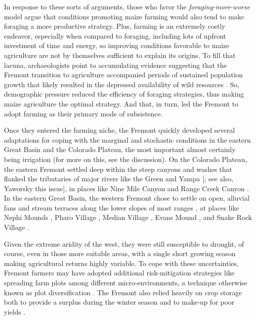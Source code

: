 \documentclass[
  number,
  preprint,
  3p]{elsarticle}
\begin{document}
In response to these sorts of arguments, those who favor the
\emph{foraging-more-worse} model \citep{hart2021, barlow2002} argue that
conditions promoting maize farming would also tend to make foraging a
more productive strategy. Plus, farming is an extremely costly endeavor,
especially when compared to foraging, including lots of upfront
investment of time and energy, so improving conditions favorable to
maize agriculture are not by themselves sufficient to explain its
origins. To fill that lacuna, archaeologists point to accumulating
evidence suggesting that the Fremont transition to agriculture
accompanied periods of sustained population growth
\citep{barlow2008, codding2021, spangler2013} that likely resulted in
the depressed availability of wild resources
\citep{barlow2002, janetski1997, simms1986}. So, demographic pressure
reduced the efficiency of foraging strategies, thus making maize
agriculture the optimal strategy. And that, in turn, led the Fremont to
adopt farming as their primary mode of subsistence.

Once they entered the farming niche, the Fremont quickly developed
several adaptations for coping with the marginal and stochastic
conditions in the eastern Great Basin and the Colorado Plateau, the most
important almost certainly being irrigation (for more on this, see the
discussion). On the Colorado Plateau, the eastern Fremont settled deep
within the steep canyons and washes that flanked the tributaries of
major rivers like the Green and Yampa {[}\citep{yaworsky2021}; see also,
Yaworsky this issue{]}, in places like Nine Mile Canyon
\citep{spangler1993} and Range Creek Canyon \citep{hart2021}. In the
eastern Great Basin, the western Fremont chose to settle on open,
alluvial fans and stream terraces along the lower slopes of most ranges
\citep{janetski2000, madsen1998, simms2008}, at places like Nephi Mounds
\citep{sharrock1967}, Pharo Village \citep{marwitt1968}, Median Village
\citep{marwitt1970}, Evans Mound \citep{berry1972, dodd1982}, and Snake
Rock Village \citep{aikens1967}.

Given the extreme aridity of the west, they were still susceptible to
drought, of course, even in those more suitable areas, with a single
short growing season making agricultural returns highly variable. To
cope with these uncertainties, Fremont farmers may have adopted
additional risk-mitigation strategies like spreading farm plots among
different micro-environments, a technique otherwise known as plot
diversification \citep{spangler1993, spangler2013, patterson2015}. The
Fremont also relied heavily on crop storage both to provide a surplus
during the winter season and to make-up for poor yields
\citep{spangler2019}.
\end{document}

